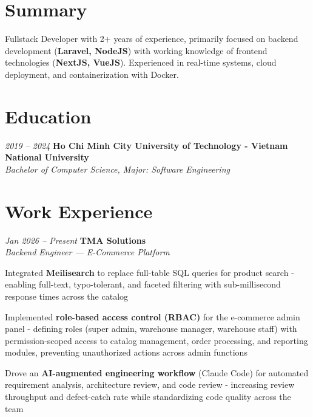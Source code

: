 \section{Summary}
\begin{onecolentry}
    Fullstack Developer with 2+ years of experience, primarily focused on backend development (\textbf{Laravel, NodeJS}) with working knowledge of frontend technologies (\textbf{NextJS, VueJS}). Experienced in real-time systems, cloud deployment, and containerization with Docker.
\end{onecolentry}


\section{Education}
\begin{twocolentry}{\textit{2019 -- 2024}}
    \textbf{Ho Chi Minh City University of Technology - Vietnam National University}\\[4pt]
    \textit{Bachelor of Computer Science, Major: Software Engineering}
\end{twocolentry}


\section{Work Experience}

\begin{twocolentry}{\textit{Jan 2026 -- Present}}
    \textbf{TMA Solutions} \\[4pt]
    \textit{Backend Engineer — E-Commerce Platform}
\end{twocolentry}
\begin{onecolentry}
    \begin{highlights}
        \item Integrated \textbf{Meilisearch} to replace full-table SQL queries for product search - enabling full-text, typo-tolerant, and faceted filtering with sub-millisecond response times across the catalog
        \item Implemented \textbf{role-based access control (RBAC)} for the e-commerce admin panel - defining roles (super admin, warehouse manager, warehouse staff) with permission-scoped access to catalog management, order processing, and reporting modules, preventing unauthorized actions across admin functions
        \item Drove an \textbf{AI-augmented engineering workflow} (Claude Code) for automated requirement analysis, architecture review, and code review - increasing review throughput and defect-catch rate while standardizing code quality across the team
    \end{highlights}
\end{onecolentry}
\vspace{0.2 cm}

